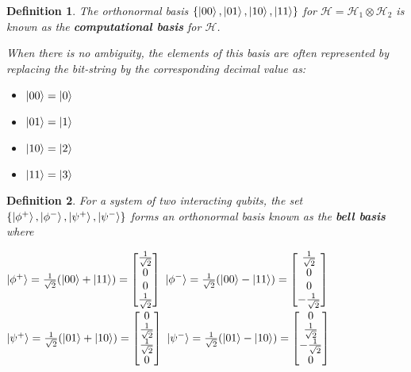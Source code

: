 \documentclass[12pt,twoside,fleqn]{report}
\theoremstyle{thmstyle}
\newtheorem{defn}{Definition}[chapter]
\begin{document}
\begin{defn}
    The orthonormal basis $\{ \ket{00}, \ket{01}, \ket{10}, \ket{11} \}$ for $\mathcal{H} = \mathcal{H}_1 \otimes \mathcal{H}_2$ is known as the \textbf{computational basis} for $\mathcal{H}$.

    When there is no ambiguity, the elements of this basis are often represented by replacing the bit-string by the corresponding decimal value as:

    \begin{itemize}
        \item $\ket{00} = \ket{0}$
        \item $\ket{01} = \ket{1}$
        \item $\ket{10} = \ket{2}$
        \item $\ket{11} = \ket{3}$
    \end{itemize}

\end{defn}

\begin{defn}
    For a system of two interacting qubits, the set $\{ \ket{\phi^+}, \ket{\phi^-}, \ket{\psi^+}, \ket{\psi^-} \}$ forms an orthonormal basis known as the \textbf{bell basis} where 

    $\ket{\phi^+} = \frac{1}{\sqrt{2}} (\ket{00} + \ket{11}) = \begin{bmatrix} \frac{1}{\sqrt{2}} \\ 0 \\ 0 \\ \frac{1}{\sqrt{2}} \end{bmatrix}$
    $\ket{\phi^-} = \frac{1}{\sqrt{2}} (\ket{00} - \ket{11}) = \begin{bmatrix} \frac{1}{\sqrt{2}} \\ 0 \\ 0 \\ - \frac{1}{\sqrt{2}} \end{bmatrix}$
        $\ket{\psi^+} = \frac{1}{\sqrt{2}} (\ket{01} + \ket{10}) = \begin{bmatrix} 0 \\ \frac{1}{\sqrt{2}} \\ \frac{1}{\sqrt{2}} \\0 \end{bmatrix}$
        $\ket{\psi^-} = \frac{1}{\sqrt{2}} (\ket{01} - \ket{10}) = \begin{bmatrix} 0 \\ \frac{1}{\sqrt{2}} \\ - \frac{1}{\sqrt{2}} \\0 \end{bmatrix}$
\end{defn}
\end{document}
